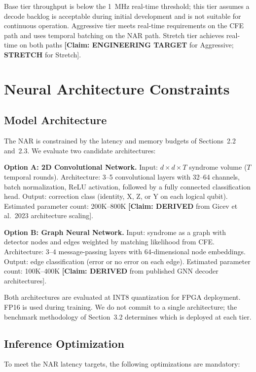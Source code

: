 \documentclass[conference]{IEEEtran}
\begin{document}
Base tier throughput is below the 1~MHz real-time threshold; this tier assumes a decode backlog is acceptable during initial development and is not suitable for continuous operation. Aggressive tier meets real-time requirements on the CFE path and uses temporal batching on the NAR path. Stretch tier achieves real-time on both paths \textbf{[Claim: ENGINEERING TARGET} for Aggressive; \textbf{STRETCH} for Stretch].

\section{Neural Architecture Constraints}

\subsection{Model Architecture}

The NAR is constrained by the latency and memory budgets of Sections~2.2 and~2.3. We evaluate two candidate architectures:

\textbf{Option A: 2D Convolutional Network.} Input: $d \times d \times T$ syndrome volume ($T$ temporal rounds). Architecture: 3--5 convolutional layers with 32--64 channels, batch normalization, ReLU activation, followed by a fully connected classification head. Output: correction class (identity, X, Z, or Y on each logical qubit). Estimated parameter count: 200K--800K \textbf{[Claim: DERIVED} from Gicev et al.\ 2023 architecture scaling].

\textbf{Option B: Graph Neural Network.} Input: syndrome as a graph with detector nodes and edges weighted by matching likelihood from CFE. Architecture: 3--4 message-passing layers with 64-dimensional node embeddings. Output: edge classification (error or no error on each edge). Estimated parameter count: 100K--400K \textbf{[Claim: DERIVED} from published GNN decoder architectures].

Both architectures are evaluated at INT8 quantization for FPGA deployment. FP16 is used during training. We do not commit to a single architecture; the benchmark methodology of Section~3.2 determines which is deployed at each tier.

\subsection{Inference Optimization}

To meet the NAR latency targets, the following optimizations are mandatory:
\end{document}
